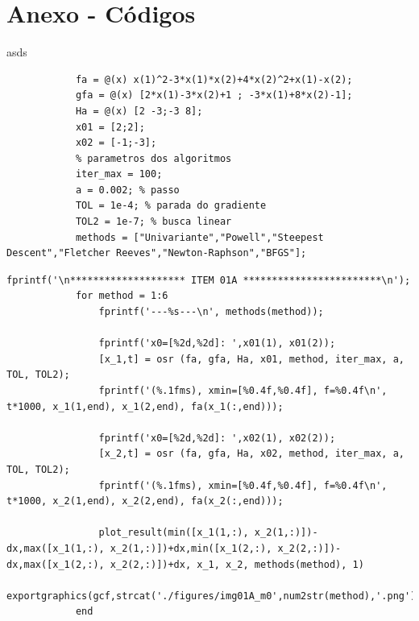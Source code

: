 \documentclass[10pt, a4paper]{article}
\begin{document}
\section{Anexo - C\'odigos}

asds


\begin{minipage}{\linewidth}
      \begin{lstlisting}[style=myStyle, caption=script t01.m setando par\^ametros e criando as fun\c c\~oes, label=l1]
            % dados do item 01a, f, grad f, hess f e x0
            fa = @(x) x(1)^2-3*x(1)*x(2)+4*x(2)^2+x(1)-x(2);
            gfa = @(x) [2*x(1)-3*x(2)+1 ; -3*x(1)+8*x(2)-1];
            Ha = @(x) [2 -3;-3 8];
            x01 = [2;2];
            x02 = [-1;-3];
            % parametros dos algoritmos
            iter_max = 100;
            a = 0.002; % passo
            TOL = 1e-4; % parada do gradiente
            TOL2 = 1e-7; % busca linear
            methods = ["Univariante","Powell","Steepest Descent","Fletcher Reeves","Newton-Raphson","BFGS"];
      \end{lstlisting}
\end{minipage}

\begin{minipage}{\linewidth}
      \begin{lstlisting}[style=myStyle, caption=script t01.m chamando o script osr.m para a fun\c c\~ao do item 1a para cada um dos 6 m\'etodos estudados, label=l2]
            fprintf('\n******************** ITEM 01A ************************\n');
            for method = 1:6
                fprintf('---%s---\n', methods(method));

                fprintf('x0=[%2d,%2d]: ',x01(1), x01(2));
                [x_1,t] = osr (fa, gfa, Ha, x01, method, iter_max, a, TOL, TOL2);
                fprintf('(%.1fms), xmin=[%0.4f,%0.4f], f=%0.4f\n', t*1000, x_1(1,end), x_1(2,end), fa(x_1(:,end)));

                fprintf('x0=[%2d,%2d]: ',x02(1), x02(2));
                [x_2,t] = osr (fa, gfa, Ha, x02, method, iter_max, a, TOL, TOL2);
                fprintf('(%.1fms), xmin=[%0.4f,%0.4f], f=%0.4f\n', t*1000, x_2(1,end), x_2(2,end), fa(x_2(:,end)));

                plot_result(min([x_1(1,:), x_2(1,:)])-dx,max([x_1(1,:), x_2(1,:)])+dx,min([x_1(2,:), x_2(2,:)])-dx,max([x_1(2,:), x_2(2,:)])+dx, x_1, x_2, methods(method), 1)
                exportgraphics(gcf,strcat('./figures/img01A_m0',num2str(method),'.png'),'Resolution',500)
            end
      \end{lstlisting}
\end{minipage}
\end{document}
